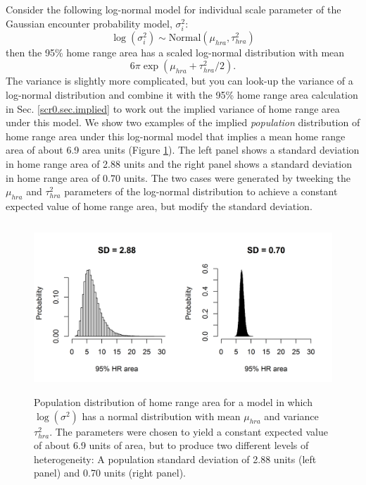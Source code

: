 Consider the following log-normal model for individual scale parameter
of the Gaussian encounter probability model, $\sigma_{i}^{2}$:
\[
 \log(\sigma^{2}_{i}) \sim \mbox{Normal}(\mu_{hra}, \tau^{2}_{hra})
\]
then the 95\% home range area has a scaled
log-normal distribution with mean 
\[
6 \pi \exp(\mu_{hra} + \tau^{2}_{hra}/2). 
\]
The variance is slightly more complicated, but you
can look-up  the variance of a log-normal distribution and combine it
with the 95\% home range area calculation in
Sec. \ref{scr0.sec.implied} to work out the implied variance of home
range area under this model.
We show two examples of the implied {\it population} distribution of
home range area under this log-normal model that implies 
 a mean home range area of about 6.9 area units (Figure
\ref{covariates.fig.one}). The left panel shows a standard deviation
in home range area of 2.88 units and the right panel shows a standard
deviation in home range area of 0.70 units. The two cases were
generated by tweeking the $\mu_{hra}$ and $\tau^{2}_{hra}$ parameters
of the log-normal distribution to achieve a constant expected value of
home range area, but modify the standard deviation. 




\begin{figure}[ht]
\begin{center}
\includegraphics[height=2.5in,width=5in]{Ch8-Covariates/figs/area_heterogeneity.png}
\end{center}
\caption{
Population distribution of home range area for a model in which
$\log(\sigma^{2})$ has a normal distribution with mean $\mu_{hra}$ and
variance $\tau^{2}_{hra}$. The parameters were chosen to yield a
constant expected value of about 6.9 units of area, but to produce two
different levels of heterogeneity: A population standard deviation of
2.88 units (left panel) and 0.70 units (right panel). 
}
\label{covariates.fig.one}
\end{figure}



